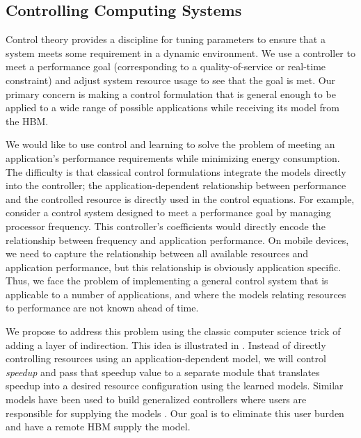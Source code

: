 
\subsection{Controlling Computing Systems}

Control theory provides a discipline for tuning parameters to ensure
that a system meets some requirement in a dynamic environment.  We use
a controller to meet a performance goal (corresponding to a
quality-of-service or real-time constraint) and adjust system resource
usage to see that the goal is met.  Our primary concern is making a
control formulation that is general enough to be applied to a wide
range of possible applications while receiving its model from the HBM.

We would like to use control and learning to solve the problem of
meeting an application's performance requirements while minimizing
energy consumption.  The difficulty is that classical control
formulations integrate the models directly into the controller; \ie
the application-dependent relationship between performance and the
controlled resource is directly used in the control equations.  For
example, consider a control system designed to meet a performance goal
by managing processor frequency.  This controller's coefficients would
directly encode the relationship between frequency and application
performance.  On mobile devices, we need to capture the relationship
between all available resources and application performance, but this
relationship is obviously application specific.  Thus, we face the
problem of implementing a general control system that is applicable to
a number of applications, and where the models relating resources to
performance are not known ahead of time.

We propose to address this problem using the classic computer science
trick of adding a layer of indirection.  This idea is illustrated in
.  Instead of directly controlling resources using an
application-dependent model, we will control \emph{speedup} and pass
that speedup value to a separate module that translates speedup into a
desired resource configuration using the learned models.  Similar
models have been used to build generalized controllers where users are
responsible for supplying the models \cite{POET}.  Our goal is to
eliminate this user burden and have a remote HBM supply the model.

